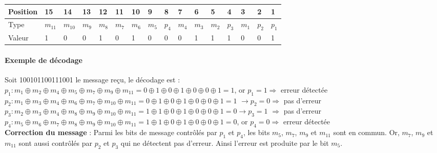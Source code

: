 \documentclass[a4paper, 12pt]{article}
\begin{document}
	\begin{center}
		\begin{tabular}{|m{1.7cm}<{\centering}|m{0.5cm}<{\centering}|m{0.5cm}<{\centering}|m{0.5cm}<{\centering}|m{0.5cm}<{\centering}|m{0.5cm}<{\centering}|m{0.5cm}<{\centering}|m{0.5cm}<{\centering}|m{0.5cm}<{\centering}|m{0.5cm}<{\centering}|m{0.5cm}<{\centering}|m{0.5cm}<{\centering}|m{0.5cm}<{\centering}|m{0.5cm}<{\centering}|m{0.5cm}<{\centering}|m{0.5cm}<{\centering}|}
			\hline
			Position & 15 & 14 & 13 & 12 & 11 & 10 & 9 & 8 & 7 & 6 & 5 & 4 & 3 & 2 & 1 \\
			\hline
			Type & $m_{11}$ & $m_{10}$ & $m_{9}$ & $m_{8}$ & $m_{7}$ & $m_{6}$ & $m_{5}$ & $p_{4}$ & $m_{4}$ & $m_{3}$ & $m_{2}$ & $p_{3}$ & $m_{1}$ & $p_{2}$ & $p_{1}$ \\
			\hline
			Valeur & 1 & 0 & 0 & 1 & 0 & 1 & 0 & 0 & 0 & 1 & 1 & 1 & 0 & 0 & 1 \\
			\hline
		\end{tabular}
	\end{center}
	\paragraph{Exemple de décodage} Soit 100101100111001 le message reçu, le décodage est : \\
	{\small $p_{1} : m_{1} \oplus m_{2} \oplus m_{4} \oplus m_{5} \oplus m_{7} \oplus m_{9} \oplus m_{11} = 0 \oplus 1 \oplus 0 \oplus 1 \oplus 0 \oplus 0 \oplus 1 = 1$}, or $p_{1} = 1 \Longrightarrow$ erreur détectée \\
	{\small $p_{2} : m_{1} \oplus m_{3} \oplus m_{4} \oplus m_{6} \oplus m_{7} \oplus m_{10} \oplus m_{11} = 0 \oplus 1 \oplus 0 \oplus 1 \oplus 0 \oplus 0 \oplus 1 = 1$} $\rightarrow p_{2} = 0 \Longrightarrow$ pas d’erreur \\
	{\small $p_{3} : m_{2} \oplus m_{3} \oplus m_{4} \oplus m_{8} \oplus m_{9} \oplus m_{10} \oplus m_{11} = 1 \oplus 1 \oplus 0 \oplus 1 \oplus 0 \oplus 0 \oplus 1 = 0 \rightarrow p_{3} = 1$} $\Longrightarrow$ pas d’erreur \\
	{\small $p_{4} : m_{5} \oplus m_{6} \oplus m_{7} \oplus m_{8} \oplus m_{9} \oplus m_{10} \oplus m_{11} = 1 \oplus 1 \oplus 0 \oplus 1 \oplus 0 \oplus 0 \oplus 1 = 0$}, or $p_{4} = 0 \Longrightarrow$ erreur détectée \\
	\textbf{Correction du message} : Parmi les bits de message contrôlés par $p_{1}$ et $p_{4}$, les bits $m_{5}$, $m_{7}$, $m_{9}$ et $m_{11}$ sont en commun. Or, $m_{7}$, $m_{9}$ et $m_{11}$ sont aussi contrôlés par $p_{2}$ et $p_{3}$ qui ne détectent pas d’erreur. Ainsi l’erreur est produite par le bit $m_{5}$.
\end{document}
